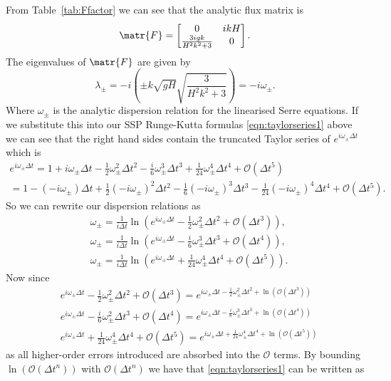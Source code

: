 From Table~\ref{tab:Ffactor} we can see that the analytic flux matrix is
\[\matr{F} = \begin{bmatrix}
0  & ikH \\ \frac{3igk}{H^2k^2 + 3} & 0
\end{bmatrix}.\]
The eigenvalues of $\matr{F}$ are given by
\[\lambda_\pm = -i \left(\pm k\sqrt{gH} \sqrt{\frac{3}{H^2 k^2 + 3}}\right) = -i\omega_\pm.\]
Where $\omega_\pm$ is the analytic dispersion relation for the linearised Serre equations. 
If we substitute this into our SSP Runge-Kutta formulas \eqref{eqn:taylorseries1} above we can see that the right hand sides contain the truncated Taylor series of $e^{i \omega_\pm \Delta t} $ which is
\begin{multline*}
e^{i \omega_\pm \Delta t} = 1 + i \omega_\pm \Delta t - \frac{1}{2}\omega_\pm^2\Delta t^2 - \frac{i}{6}\omega_\pm^3 \Delta t^3 + \frac{1}{24}\omega_\pm^4 \Delta t ^4 + \mathcal{O}\left(\Delta t^5\right) \\ =1 - \left(-i \omega_\pm\right) \Delta t + \frac{1}{2}\left(-i \omega_\pm\right)^2\Delta t^2 - \frac{1}{6}\left(-i \omega_\pm\right)^3 \Delta t^3 - \frac{1}{24}\left(-i \omega_\pm\right)^4 \Delta t ^4 + \mathcal{O}\left(\Delta t^5\right).
\end{multline*}
So we can rewrite our dispersion relations as
\begin{align*}
&\omega_\pm = \frac{1}{i \Delta t} \ln\left(e^{i \omega_\pm \Delta t} - \frac{1}{2}\omega_\pm^2 \Delta t^2 + \mathcal{O}\left(\Delta t^3\right) \right),\\
&\omega_\pm = \frac{1}{i \Delta t} \ln\left(e^{i \omega_\pm \Delta t} - \frac{i}{6}\omega_\pm^3 \Delta t^3 + \mathcal{O}\left(\Delta t^4\right)\right),\\
&\omega_\pm = \frac{1}{i \Delta t} \ln\left(e^{i \omega_\pm \Delta t} + \frac{1}{24}\omega_\pm^4 \Delta t^4 + \mathcal{O}\left(\Delta t^5\right)\right).
\end{align*}
Now since
\begin{align*}
&e^{i \omega_\pm \Delta t} - \frac{1}{2}\omega_\pm^2 \Delta t^2 + \mathcal{O}\left(\Delta t^3\right)= e^{i \omega_\pm \Delta t - \frac{1}{2}\omega_\pm^2 \Delta t^2 + \ln \left(\mathcal{O}\left(\Delta t^3\right)\right)} \\  
&e^{i \omega_\pm \Delta t} - \frac{i}{6}\omega_\pm^2 \Delta t^3 + \mathcal{O}\left(\Delta t^4\right) = e^{i \omega_\pm \Delta t - \frac{i}{6}\omega_\pm^3 \Delta t^3 + \ln \left(\mathcal{O}\left(\Delta t^4\right)\right)}  \\
&e^{i \omega_\pm \Delta t} + \frac{1}{24}\omega_\pm^4 \Delta t^4 + \mathcal{O}\left(\Delta t^5\right) = e^{i \omega_\pm \Delta t + \frac{1}{24}\omega_\pm^4 \Delta t^4 + \ln \left(\mathcal{O}\left(\Delta t^5\right)\right)} 
\end{align*}
as all higher-order errors introduced are absorbed into the $\mathcal{O}$ terms. By bounding $\ln \left(\mathcal{O}\left(\Delta t^n\right)\right)$ with $\mathcal{O}\left(\Delta t^n\right)$ we have that \eqref{eqn:taylorseries1} can be written as

